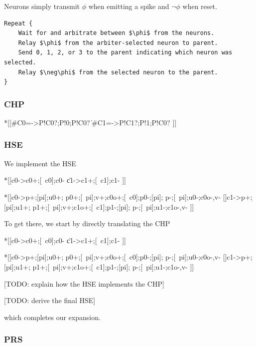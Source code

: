 \documentclass{article}
\begin{document}
Neurons simply transmit $\phi$ when emitting a spike and 
$\neg\phi$ when reset.

\begin{lstlisting}[mathescape]
Repeat {
    Wait for and arbitrate between $\phi$ from the neurons.
    Relay $\phi$ from the arbiter-selected neuron to parent.
    Send 0, 1, 2, or 3 to the parent indicating which neuron was selected.
    Relay $\neg\phi$ from the selected neuron to the parent.
}
\end{lstlisting}

\subsubsection*{CHP}

\begin{csp}
*[[#{C0=\phi}->P!C0?;P!0;P!C0?
  \|#{C1=\phi}->P!C1?;P!1;P!C0?
 ]]
\end{csp}

\subsubsection*{HSE}

We implement the HSE

\begin{hse}
*[[c0\phi->c0+;[~c0\phi];c0-
  \|c1\phi->c1+;[~c1\phi];c1-
 ]]

*[[c0->p\phi+;[pi];u0+;
    p0+;[~pi];v+;c0o+;[~c0];p0-;[pi];
    p\phi-;[~pi];u0-;c0o-,v-
  []c1->p\phi+;[pi];u1+;
    p1+;[~pi];v+;c1o+;[~c1];p1-;[pi];
    p\phi-;[~pi];u1-;c1o-,v-
 ]]
\end{hse}

\noindent
To get there, we start by directly translating the CHP

\begin{hse}
*[[c0\phi->c0+;[~c0\phi];c0-
  \|c1\phi->c1+;[~c1\phi];c1-
 ]]

*[[c0->p\phi+;[pi];u0+;
    p0+;[~pi];v+;c0o+;[~c0];p0-;[pi];
    p\phi-;[~pi];u0-;c0o-,v-
  []c1->p\phi+;[pi];u1+;
    p1+;[~pi];v+;c1o+;[~c1];p1-;[pi];
    p\phi-;[~pi];u1-;c1o-,v-
 ]]
\end{hse}

[TODO: explain how the HSE implements the CHP]

[TODO: derive the final HSE]

\noindent
which completes our expansion.

\subsubsection*{PRS}
\end{document}
